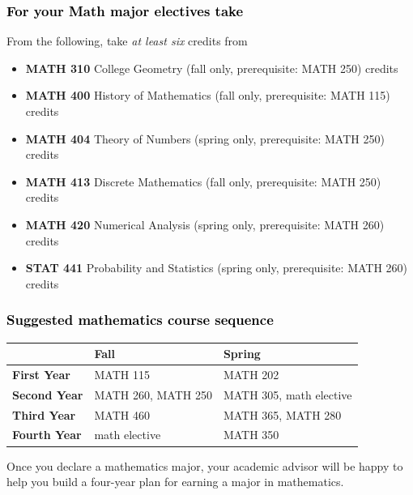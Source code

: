 \documentclass[10pt]{article}
\newcommand{\calconeshort}{MATH 115}
\newcommand{\calctwoshort}{MATH 202}
\newcommand{\foundationsshort}{MATH 250}
\newcommand{\calcthreeshort}{MATH 260}
\newcommand{\linearshort}{MATH 280}
\newcommand{\discrete}{\textbf{MATH 413} Discrete Mathematics  (fall only, prerequisite: MATH 250)\dotfill 3 credits}
\newcommand{\statistics}{\textbf{STAT 441} Probability and Statistics (spring only, prerequisite: MATH 260)  \dotfill  3 credits}
\newcommand{\diffeqshort}{MATH 305}
\newcommand{\abstractalgebrashort}{MATH 350}
\newcommand{\complexshort}{MATH 365}
\newcommand{\advancedcalcshort}{MATH 460}
\newcommand{\numerical}{\textbf{MATH 420}   Numerical Analysis   (spring only, prerequisite: MATH 260)\dotfill 3 credits}
\newcommand{\collegegeometry}{\textbf{MATH 310}	College Geometry (fall only,  prerequisite: MATH 250) \dotfill 3 credits}
\newcommand{\mathhistory}{\textbf{MATH 400} History of Mathematics (fall only,  prerequisite: MATH 115) \dotfill 3 credits}
\newcommand{\numbertheory}{\textbf{MATH 404} Theory of Numbers (spring only,  prerequisite: MATH 250) \dotfill 3 credits}
\newcommand{\mathBS}{
     \begin{center}
         \begin{tabular}[h]{| l | l | l|} 
            \hline
                       & \textbf{Fall}         &  \textbf{Spring}  \\ \hline 
            \textbf{First Year} & \calconeshort{}  & \calctwoshort \\  \hline
            \textbf{Second Year} &  \calcthreeshort{}, \foundationsshort & \diffeqshort, math elective \\ \hline
            \textbf{Third Year} & \advancedcalcshort              &  \complexshort{}, \linearshort \\ \hline
            \textbf{Fourth Year} & math elective &  \abstractalgebrashort  \\ \hline
         \end{tabular}
\end{center}}
\begin{document}
\subsubsection*{\textcolor{black}{For your Math major electives take}}

From the following, take \emph{at least six} credits from
\vspace{0.1in}

\begin{itemize}
\item \collegegeometry
\item \mathhistory
\item \numbertheory
\item \discrete
\item \numerical
\item \statistics
\end{itemize}




\subsubsection*{\textcolor{black}{Suggested mathematics course sequence}}

\mathBS


  \vspace{0.1in}

 \noindent Once you declare a mathematics major, your academic advisor will be happy to help you build a four-year plan for earning a major in mathematics.

   \vspace{0.1in}
\end{document}
